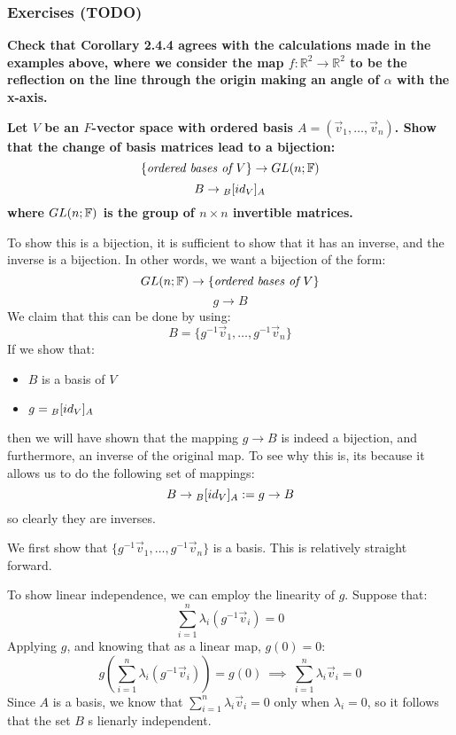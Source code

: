 \documentclass{exam}
\begin{document}
\subsubsection{Exercises (TODO)}

\begin{questions}

\question \textbf{Check that Corollary 2.4.4 agrees with the calculations made in the examples above, where we consider the map $f : \mathbb{R}^2 \to \mathbb{R}^2$ to be the reflection on the line through the origin making an angle of $\alpha$ with the x-axis.}

\question \textbf{Let $V$ be an $F$-vector space with ordered basis $A = (\vec{v}_1, \ldots, \vec{v}_n)$. Show that the change of basis matrices lead to a bijection:
\[
\{\text{\textit{ordered bases of $V$}}\} \to GL(n; \F)
\]
\[
B \to \cript{id_V}{B}{A}
\]
where $GL(n; \F)$ is the group of $n \times n$ invertible matrices.
}

To show this is a bijection, it is sufficient to show that it has an inverse, and the inverse is a bijection. In other words, we want a bijection of the form:
\[
GL(n; \F) \to \{\text{\textit{ordered bases of $V$}}\} 
\]
\[
g \to B
\]
We claim that this can be done by using:
\[
B = \{g^{-1}\vec{v}_1, \ldots, g^{-1}\vec{v}_n\}
\]
If we show that:
\begin{itemize}
    \item $B$ is a basis of $V$
    \item $g = \cript{id_V}{B}{A}$
\end{itemize}
then we will have shown that the mapping $g \to B$ is indeed a bijection, and furthermore, an inverse of the original map. To see why this is, its because it allows us to do the following set of mappings:
\[
B \to \cript{id_V}{B}{A} := g \to B
\]
so clearly they are inverses.

\bigskip

We first show that $\{g^{-1}\vec{v}_1, \ldots, g^{-1}\vec{v}_n\}$ is a basis. This is relatively straight forward.

\bigskip

To show linear independence, we can employ the linearity of $g$. Suppose that:
\[
\sum_{i = 1}^n \lambda_i (g^{-1}\vec{v}_i) = 0
\]
Applying $g$, and knowing that as a linear map, $g(0) = 0$:
\[
g\left(\sum_{i = 1}^n \lambda_i (g^{-1}\vec{v}_i)\right) = g(0) \ \implies \ \sum_{i = 1}^n \lambda_i \vec{v}_i = 0
\]
Since $A$ is a basis, we know that $\sum_{i = 1}^n \lambda_i \vec{v}_i = 0$ only when $\lambda_i = 0$, so it follows that the set $B$ s lienarly independent.


\end{questions}
\end{document}
